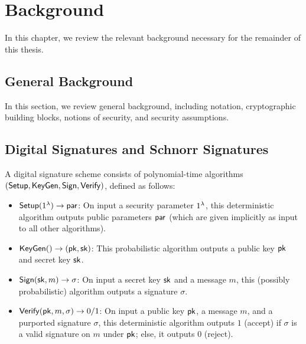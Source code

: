 \chapter{Background}

In this chapter,
we review the relevant background necessary for the remainder of this thesis.

\section{General Background}

In this section,
we review general background,
including notation, cryptographic building blocks, notions of security, and security assumptions.






\section{Digital Signatures and Schnorr Signatures} \label{schnorr-sigs}

\begin{definition} \label{defn:ds}
A digital signature scheme consists of polynomial-time algorithms $(\mathsf{Setup}, \mathsf{KeyGen}, \mathsf{Sign}, \mathsf{Verify})$, defined as follows:

  \begin{itemize}

    \item $\mathsf{Setup}(1^\lambda) \rightarrow \mathsf{par}$:
    On input a security parameter $1^\lambda$,
    this deterministic algorithm outputs public parameters $\mathsf{par}$ (which are given implicitly as input to all other algorithms).

  \item $\mathsf{KeyGen}() \rightarrow (\mathsf{pk}, \mathsf{sk})$:
  This probabilistic algorithm outputs a public key $\mathsf{pk}$ and secret key $\mathsf{sk}$.

  \item $\mathsf{Sign}(\mathsf{sk}, m) \rightarrow \sigma$:
    On input a secret key $\mathsf{sk}$ and a message $m$,
      this (possibly probabilistic) algorithm outputs a signature $\sigma$.

  \item $\mathsf{Verify}(\mathsf{pk}, m, \sigma) \rightarrow 0/1$:
  On input a public key $\mathsf{pk}$,
    a message $m$, and a purported signature $\sigma$, this deterministic algorithm outputs $1$ (accept) if $\sigma$ is a valid signature on $m$ under $\mathsf{pk}$; else, it outputs $0$ (reject).

\end{itemize}
\end{definition}

